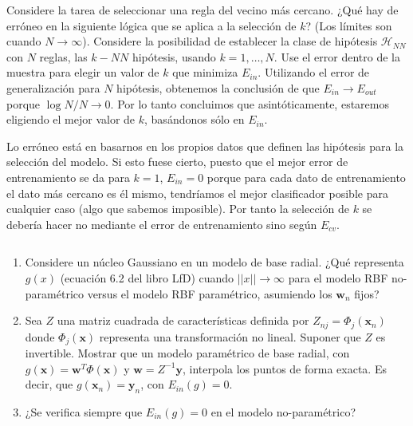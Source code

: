 \documentclass[11pt,leqno]{article}
\theoremstyle{definition}
\begin{document}

\begin{cuestion}
Considere la tarea de seleccionar una regla del vecino más cercano. ¿Qué hay de erróneo en la siguiente lógica que se aplica a la selección de $k$? (Los límites son cuando $N \rightarrow \infty$).
Considere la posibilidad de establecer la clase de hipótesis $\mathcal{H}_{NN}$ con $N$ reglas, las $k-NN$ hipótesis, usando $k =1,\dots,N$. Use el error dentro de la muestra para elegir un valor de $k$ que minimiza $E_{in}$. Utilizando el error de generalización para $N$ hipótesis, obtenemos la conclusión de que $E_{in} \rightarrow E_{out}$ porque $\log N/N \rightarrow 0$. Por lo tanto concluimos que asintóticamente, estaremos eligiendo el mejor valor de $k$, basándonos sólo en $E_{in}$.
\end{cuestion}

  \begin{solucion}
  	Lo erróneo está en basarnos en los propios datos que definen las hipótesis para la selección del modelo. Si esto fuese cierto, puesto que el mejor error de entrenamiento se da para $k=1$, $E_{in}=0$ porque para cada dato de entrenamiento el dato más cercano es él mismo, tendríamos el mejor clasificador posible para cualquier caso (algo que sabemos imposible). Por tanto la selección de $k$ se debería hacer no mediante el error de entrenamiento sino según $E_{cv}$.
  \end{solucion}


\begin{cuestion} $ $
\begin{enumerate}[a]
\item Considere un núcleo Gaussiano en un modelo de base radial. ¿Qué representa $g(x)$ (ecuación 6.2 del libro LfD) cuando $||x|| \rightarrow \infty$ para el modelo RBF no-paramétrico versus el modelo RBF paramétrico, asumiendo los $\mathbf{w}_n$ fijos?
\item Sea $Z$ una matriz cuadrada de características definida por $Z_{nj} = \Phi_j(\mathbf{x}_n)$ donde $\Phi_j(\mathbf{x})$ representa una transformación no lineal. Suponer que $Z$ es invertible. Mostrar que un modelo paramétrico de base radial, con $g(\mathbf{x}) = \mathbf{w}^T \Phi(\mathbf{x})$ y $\mathbf{w} = Z^{-1}\mathbf{y}$, interpola los puntos de forma exacta. Es decir, que $g(\mathbf{x}_n) = \mathbf{y}_n$, con $E_{in}(g)=0$.
\item ¿Se verifica siempre que $E_{in}(g)=0$ en el modelo no-paramétrico?
\end{enumerate}
\end{cuestion}
\end{document}
